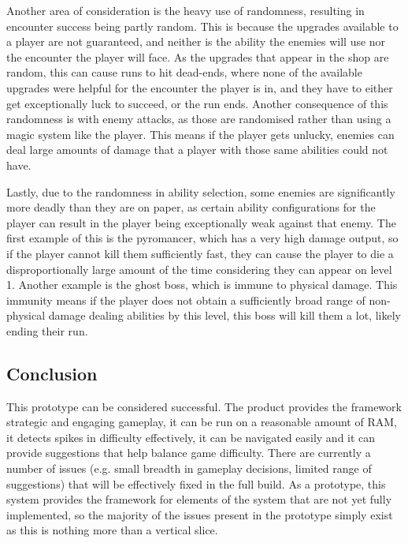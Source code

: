 Another area of consideration is the heavy use of randomness, resulting in encounter success being partly random. This is because the upgrades available to a player are not guaranteed, and neither is the ability the enemies will use nor the encounter the player will face. As the upgrades that appear in the shop are random, this can cause runs to hit dead-ends, where none of the available upgrades were helpful for the encounter the player is in, and they have to either get exceptionally luck to succeed, or the run ends. Another consequence of this randomness is with enemy attacks, as those are randomised rather than using a magic system like the player. This means if the player gets unlucky, enemies can deal large amounts of damage that a player with those same abilities could not have. 

Lastly, due to the randomness in ability selection, some enemies are significantly more deadly than they are on paper, as certain ability configurations for the player can result in the player being exceptionally weak against that enemy. The first example of this is the pyromancer, which has a very high damage output, so if the player cannot kill them sufficiently fast, they can cause the player to die a disproportionally large amount of the time considering they can appear on level 1. Another example is the ghost boss, which is immune to physical damage. This immunity means if the player does not obtain a sufficiently broad range of non-physical damage dealing abilities by this level, this boss will kill them a lot, likely ending their run. 

\subsection{Conclusion}

This prototype can be considered successful. The product provides the
framework strategic and engaging gameplay, it can be run on a reasonable
amount of RAM, it detects spikes in difficulty effectively, it can be
navigated easily and it can provide suggestions that help balance game
difficulty. There are currently a number of issues (e.g. small breadth
in gameplay decisions, limited range of suggestions) that will be
effectively fixed in the full build. As a prototype, this system
provides the framework for elements of the system that are not yet fully
implemented, so the majority of the issues present in the prototype
simply exist as this is nothing more than a vertical slice.

